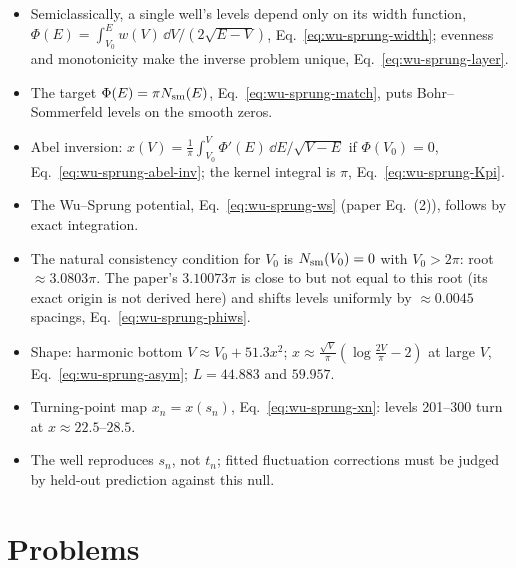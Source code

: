 \begin{itemize}
\item Semiclassically, a single well's levels depend only on its width function, $\Phi(E)=\int_{V_0}^{E}w(V)\,\dd V/(2\sqrt{E-V})$, Eq.~\eqref{eq:wu-sprung-width}; evenness and monotonicity make the inverse problem unique, Eq.~\eqref{eq:wu-sprung-layer}.
\item The target $\Phi(E)=\pi N_{\mathrm{sm}}(E)$, Eq.~\eqref{eq:wu-sprung-match}, puts Bohr--Sommerfeld levels on the smooth zeros.
\item Abel inversion: $x(V)=\frac1\pi\int_{V_0}^{V}\Phi'(E)\,\dd E/\sqrt{V-E}$ if $\Phi(V_0)=0$, Eq.~\eqref{eq:wu-sprung-abel-inv}; the kernel integral is $\pi$, Eq.~\eqref{eq:wu-sprung-Kpi}.
\item The Wu--Sprung potential, Eq.~\eqref{eq:wu-sprung-ws} (paper Eq.~(2)), follows by exact integration.
\item The natural consistency condition for $V_0$ is $N_{\mathrm{sm}}(V_0)=0$ with $V_0>2\pi$: root $\approx3.0803\pi$. The paper's $3.10073\pi$ is close to but not equal to this root (its exact origin is not derived here) and shifts levels uniformly by $\approx0.0045$ spacings, Eq.~\eqref{eq:wu-sprung-phiws}.
\item Shape: harmonic bottom $V\approx V_0+51.3x^2$; $x\approx\frac{\sqrt V}\pi(\log\frac{2V}\pi-2)$ at large $V$, Eq.~\eqref{eq:wu-sprung-asym}; $L=44.883$ and $59.957$.
\item Turning-point map $x_n=x(s_n)$, Eq.~\eqref{eq:wu-sprung-xn}: levels 201--300 turn at $x\approx22.5$--$28.5$.
\item The well reproduces $s_n$, not $t_n$; fitted fluctuation corrections must be judged by held-out prediction against this null.
\end{itemize}

\section{Problems}


